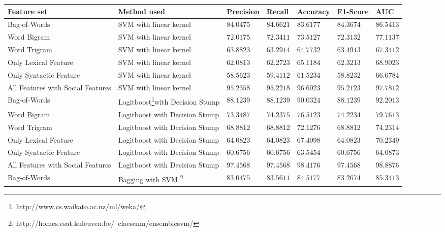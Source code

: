 \begin{table}[htb]
  \centering
  {\small
  \begin{tabular}{|@{~}l@{~~}|@{~~}l@{~}|@{~~}l@{~}|@{~~}l@{~}|@{~~}l@{~}|@{~~}l@{~}|@{~~}l@{~}|}
\hline
Feature set & Method used & Precision & Recall & Accuracy & F1-Score & AUC \\\hline
Bag-of-Words & SVM with linear kernel & $84.0475$ & $84.6621$ & $83.6177$ & $84.3674$ & $86.5413$ \\\hline
Word Bigram & SVM with linear kernel & $72.0175$ & $72.3411$ & $73.5127$ & $72.3132$ & $77.1137$  \\\hline
Word Trigram & SVM with linear kernel & $63.8823$ & $63.2914$ & $64.7732$ & $63.4913$  & $67.3412$  \\\hline
Only Lexical Feature & SVM with linear kernel & $62.0813$ & $62.2723$ & $65.1184$ & $62.3213$   & $68.9023$ \\\hline
Only Syntactic Feature & SVM with linear kernel & $58.5623$ & $59.4112$ & $61.5234$ & $58.8232$  & $66.6784$ \\\hline
All Features with Social Features & SVM with linear kernel & $\mathbf{95.2358}$ & $\mathbf{95.2218}$ & $\mathbf{96.6023}$ & $\mathbf{95.2123}$   & $\mathbf{97.7812}$ \\\hline
Bag-of-Words & Logitboost\footnote{http://www.cs.waikato.ac.nz/ml/weka/}with Decision Stump & $88.1239$ & $88.1239$ & $90.0324$ & $88.1239$  & $92.2013$  \\\hline
Word Bigram & Logitboost with Decision Stump & $73.3487$ & $74.2375$ & $76.5123$ & $74.2234$   & $79.7613$ \\\hline
Word Trigram & Logitboost with Decision Stump & $68.8812$ & $68.8812$ & $72.1276$ & $68.8812$   & $74.2314$ \\\hline
Only Lexical Feature & Logitboost with Decision Stump & $64.0823$ & $64.0823$ & $67.4098$ & $64.0823$  & $70.2349$  \\\hline
Only Syntactic Feature & Logitboost with Decision Stump & $60.6756$ & $60.6756$ & $63.5454$ & $60.6756$  & $64.0873$ \\\hline
All Features with Social Features & Logitboost with Decision Stump & $\mathbf{97.4568}$ & $\mathbf{97.4568}$ & $\mathbf{98.4176}$ & $\mathbf{97.4568}$ & $\mathbf{98.8876}$ \\\hline
Bag-of-Words & Bagging with SVM \footnote{http://homes.esat.kuleuven.be/~claesenm/ensemblesvm/}& $83.0475$ & $83.5611$ & $84.5177$ & $83.2674$ & $85.3413$ \\\hline

\end{tabular}}
\end{table}

